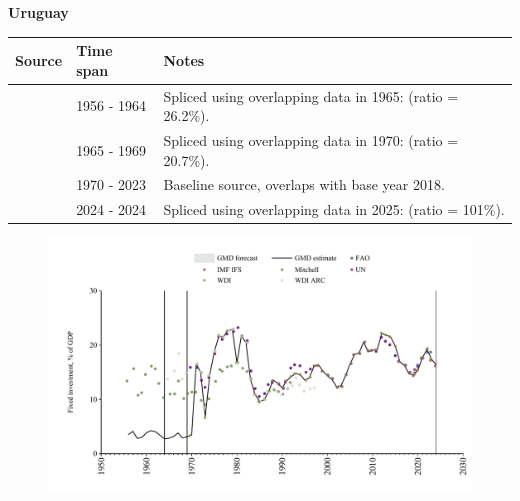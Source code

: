 \documentclass[12pt,a4paper,landscape]{article}
\begin{document}
\begin{adjustbox}{max totalsize={\paperwidth}{\paperheight},center}
\begin{minipage}[t][\textheight][t]{\textwidth}
\vspace*{0.5cm}
{}
\begin{center}
{\Large\bfseries Uruguay}
\end{center}
\vspace{0.5cm}
\begin{table}[H]
\centering
\small
\begin{tabular}{|l|l|l|}
\hline
\textbf{Source} & \textbf{Time span} & \textbf{Notes} \\
\hline
\rowcolor{white}\cite{Mitchell}& 1956 - 1964 &Spliced using overlapping data in 1965: (ratio = 26.2\%).\\
\rowcolor{lightgray}\cite{WDI_ARC}& 1965 - 1969 &Spliced using overlapping data in 1970: (ratio = 20.7\%).\\
\rowcolor{white}\cite{WDI}& 1970 - 2023 &Baseline source, overlaps with base year 2018.\\
\rowcolor{lightgray}\cite{IMF_IFS}& 2024 - 2024 &Spliced using overlapping data in 2025: (ratio = 101\%).\\
\hline
\end{tabular}
\end{table}
\begin{figure}[H]
\centering
\includegraphics[width=\textwidth,height=0.6\textheight,keepaspectratio]{graphs/URY_finv_GDP.pdf}
\end{figure}
\end{minipage}
\end{adjustbox}
\end{document}
